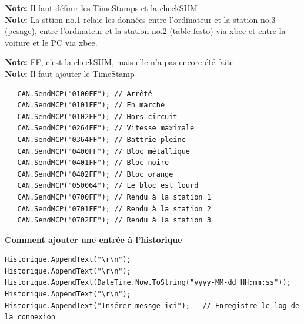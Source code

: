 \documentclass[10pt,a4paper,final]{article}
\begin{document}
\begin{spacing}{1.5}
\begin{table}[!ht]
\label{tab:testtab1}
\end{table}
\begin{flushleft}
\textbf{Note:} Il faut définir les TimeStamps et la checkSUM\\
\textbf{Note:} La sttion no.1 relaie les données entre l'ordinateur et la station no.3 (pesage), entre l'ordinateur et la station no.2 (table festo) via xbee et entre la voiture et le PC via xbee.
\end{flushleft}
\pagebreak
\textbf{Note:} FF, c'est la checkSUM, mais elle n'a pas encore été faite \\
\textbf{Note:} Il faut ajouter le TimeStamp 
\begin{verbatim}
   CAN.SendMCP("0100FF"); // Arrêté
   CAN.SendMCP("0101FF"); // En marche
   CAN.SendMCP("0102FF"); // Hors circuit
   CAN.SendMCP("0264FF"); // Vitesse maximale
   CAN.SendMCP("0364FF"); // Battrie pleine
   CAN.SendMCP("0400FF"); // Bloc métallique
   CAN.SendMCP("0401FF"); // Bloc noire
   CAN.SendMCP("0402FF"); // Bloc orange
   CAN.SendMCP("050064"); // Le bloc est lourd
   CAN.SendMCP("0700FF"); // Rendu à la station 1
   CAN.SendMCP("0701FF"); // Rendu à la station 2
   CAN.SendMCP("0702FF"); // Rendu à la station 3
\end{verbatim}

\pagebreak

\end{spacing}

\textbf{Comment ajouter une entrée à l'historique}
\begin{lstlisting}
Historique.AppendText("\r\n");
Historique.AppendText("\r\n");
Historique.AppendText(DateTime.Now.ToString("yyyy-MM-dd HH:mm:ss"));
Historique.AppendText("\r\n");
Historique.AppendText("Insérer messge ici");   // Enregistre le log de la connexion
\end{lstlisting}

\begin{center}
\HRule
\end{center}
\end{document}
